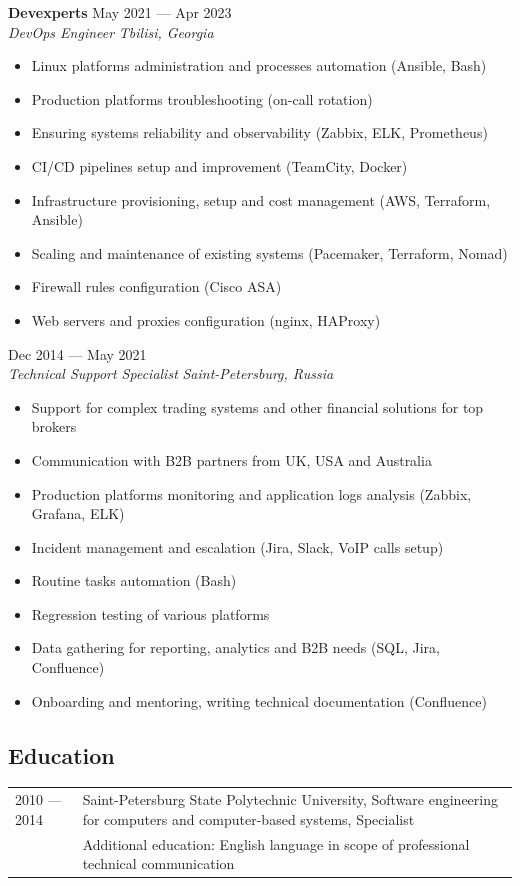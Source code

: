 \documentclass[10pt]{report}
\newenvironment{JobDescription}[5]{
    \vspace{ #5 }
    \flushleft
    {\bf #1 } \hfill { #2 }
    \\
    {\em #3 } \hfill {\em #4 }
    \begin{itemize}
} {
    \end{itemize}
}
\begin{document}
\begin{JobDescription}{Devexperts}{May 2021 --- Apr 2023}{DevOps Engineer}{Tbilisi, Georgia}{0mm}
  \item[--] Linux platforms administration and processes automation (Ansible, Bash)
  \item[--] Production platforms troubleshooting (on-call rotation)
  \item[--] Ensuring systems reliability and observability (Zabbix, ELK, Prometheus)
  \item[--] CI/CD pipelines setup and improvement (TeamCity, Docker)
  \item[--] Infrastructure provisioning, setup and cost management (AWS, Terraform, Ansible)
  \item[--] Scaling and maintenance of existing systems (Pacemaker, Terraform, Nomad)
  \item[--] Firewall rules configuration (Cisco ASA)
  \item[--] Web servers and proxies configuration (nginx, HAProxy)
\end{JobDescription}

\begin{JobDescription}{}{Dec 2014 --- May 2021}{Technical Support Specialist}{Saint-Petersburg, Russia}{0mm}
  \item[--] Support for complex trading systems and other financial solutions for top brokers
  \item[--] Communication with B2B partners from UK, USA and Australia
  \item[--] Production platforms monitoring and application logs analysis (Zabbix, Grafana, ELK)
  \item[--] Incident management and escalation (Jira, Slack, VoIP calls setup)
  \item[--] Routine tasks automation (Bash)
  \item[--] Regression testing of various platforms
  \item[--] Data gathering for reporting, analytics and B2B needs (SQL, Jira, Confluence)
  \item[--] Onboarding and mentoring, writing technical documentation (Confluence)
\end{JobDescription}

\goodbreak

\subsection*{Education}
\begin{table}[H]
  \begin{tabular}{@{}p{}p{}}
    2010 --- 2014 & Saint-Petersburg State Polytechnic University, Software engineering for computers and computer-based systems, Specialist \\
                  & Additional education: English language in scope of professional technical communication
  \end{tabular}
\end{table}
\end{document}
